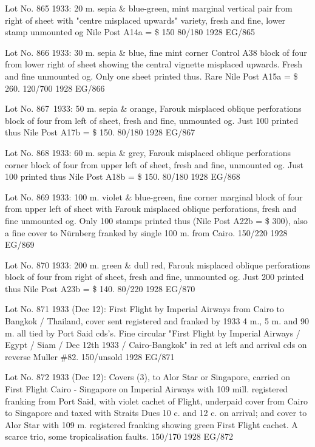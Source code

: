 \documentclass[justified]{tufte-book}
\begin{document}
%
{Lot No. 865
1933: 20 m. sepia \& blue-green, mint marginal vertical pair from right of sheet with "centre misplaced upwards" variety, fresh and fine, lower stamp unmounted og Nile Post A14a = \$ 150 80/180  }%
{1928}%
{EG/865}%
{}%
{}
{}%
{}


%
{Lot No. 866
1933: 30 m. sepia \& blue, fine mint corner Control A38 block of four from lower right of sheet showing the central vignette misplaced upwards. Fresh and fine unmounted og. Only one sheet printed thus. Rare Nile Post A15a = \$ 260.  120/700 }%
{1928}%
{EG/866}%
{}%
{}
{}%
{}


%
{Lot No. 867\
1933: 50 m. sepia \& orange, Farouk misplaced oblique perforations block of four from left of sheet, fresh and fine, unmounted og. Just 100 printed thus Nile Post A17b = \$ 150. 80/180  }%
{1928}%
{EG/867}%
{}%
{}
{}%
{}


%
{Lot No. 868
1933: 60 m. sepia \& grey, Farouk misplaced oblique perforations corner block of four from upper left of sheet, fresh and fine, unmounted og. Just 100 printed thus Nile Post A18b = \$ 150.   80/180}%
{1928}%
{EG/868}%
{}%
{}
{}%
{}


%
{Lot No. 869
1933: 100 m. violet \& blue-green, fine corner marginal block of four from upper left of sheet with Farouk misplaced oblique perforations, fresh and fine unmounted og. Only 100 stamps printed thus (Nile Post A22b = \$ 300), also a fine cover to Nürnberg franked by single 100 m. from Cairo.  150/220}%
{1928}%
{EG/869}%
{}%
{}
{}%
{}


%
{Lot No. 870
1933: 200 m. green \& dull red, Farouk misplaced oblique perforations block of four from right of sheet, fresh and fine, unmounted og. Just 200 printed thus Nile Post A23b = \$ 140.  80/220}%
{1928}%
{EG/870}%
{}%
{}
{}%
{}

%
{Lot No. 871
1933 (Dec 12): First Flight by Imperial Airways from Cairo to Bangkok / Thailand, cover sent registered and franked by 1933 4 m., 5 m. and 90 m. all tied by Port Said cds's. Fine circular  "First Flight by Imperial Airways / Egypt / Siam / Dec 12th 1933 / Cairo-Bangkok" in red at left and arrival cds on reverse Muller \#82.  150/unsold}%
{1928}%
{EG/871}%
{}%
{}
{}%
{}

%
{Lot No. 872
1933 (Dec 12): Covers (3), to Alor Star or Singapore, carried on First Flight Cairo - Singapore on Imperial Airways with 109 mill. registered franking from Port Said, with violet cachet of Flight, underpaid cover from Cairo to Singapore and taxed with Straits Dues 10 c. and 12 c. on arrival; and cover to Alor Star with 109 m. registered franking showing green First Flight cachet. A scarce trio, some tropicalisation faults.  150/170}%
{1928}%
{EG/872}%
{}%
{}
{}%
{}
\end{document}
